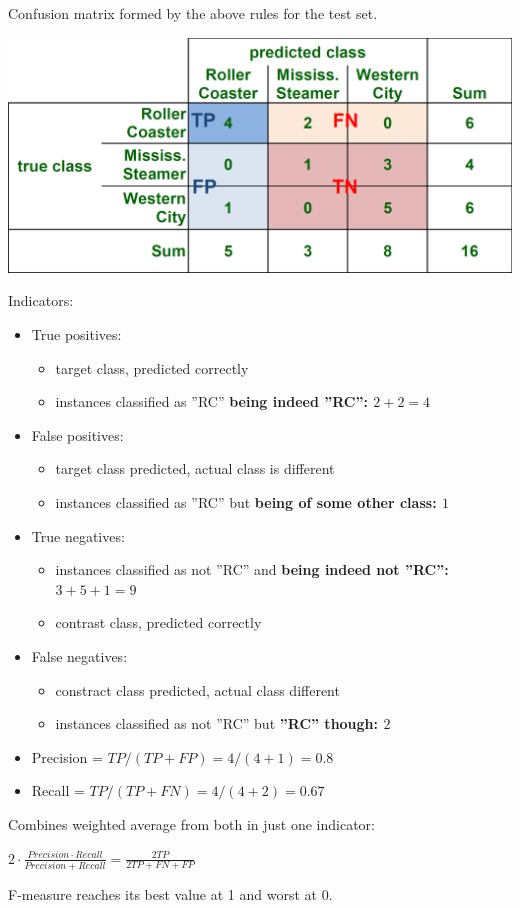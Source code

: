 \begin{breakbox}
Confusion matrix formed by the above rules for the test set.
\begin{center}
	\includegraphics[width=.15\textwidth]{slides_images/confusion_matrix_theme_park}
\end{center}

Indicators:

\begin{itemize}
	\item True positives:
	\begin{itemize}
		\item target class, predicted correctly
		\item instances classified as ''RC'' \textbf{being indeed ''RC'': $2+2=4$}
	\end{itemize}
	\item False positives:
		\begin{itemize}
			\item target class predicted, actual class is different
			\item instances classified as ''RC'' but \textbf{being of some other class: $1$}		
		\end{itemize}
	\item True negatives:
		\begin{itemize}
			\item instances classified as not ''RC'' and \textbf{being indeed not ''RC'': $3 + 5 + 1 = 9$}
			\item contrast class, predicted correctly
		\end{itemize}
	\item False negatives: 
		\begin{itemize}
			\item constract class predicted, actual class different
			\item instances classified as not ''RC'' but \textbf{''RC'' though: $2$}
		\end{itemize}
	\item Precision = $TP/(TP+FP) = 4/(4+1)=0.8$
	\item Recall = $TP/(TP+FN) = 4/(4+2)=0.67$
\end{itemize}
\end{breakbox}

\begin{breakbox}

Combines weighted average from both in just one indicator:

\begin{center}
$2 \cdot \frac{Precision \cdot Recall}{Precision + Recall} = \frac{2TP}{2TP + FN + FP} $ 
\end{center}

F-measure reaches its best value at 1 and worst at 0.
\end{breakbox}

